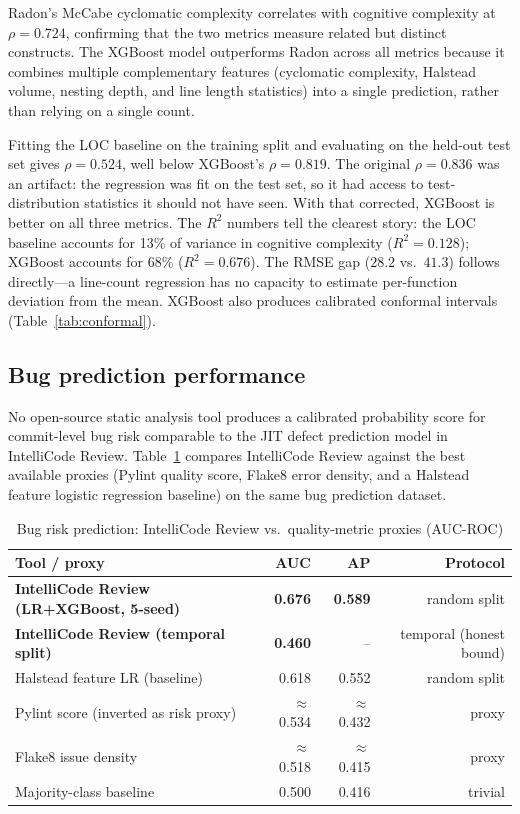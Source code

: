 \documentclass[12pt, oneside]{report}
\begin{document}
Radon's McCabe cyclomatic complexity correlates with cognitive complexity at $\rho =
0.724$, confirming that the two metrics measure related but distinct constructs. The
XGBoost model outperforms Radon across all metrics because it combines multiple
complementary features (cyclomatic complexity, Halstead volume, nesting depth, and line
length statistics) into a single prediction, rather than relying on a single count.

Fitting the LOC baseline on the training split and evaluating on the held-out test set gives $\rho = 0.524$, well below XGBoost's $\rho = 0.819$. The original $\rho = 0.836$ was an artifact: the regression was fit on the test set, so it had access to test-distribution statistics it should not have seen. With that corrected, XGBoost is better on all three metrics. The $R^2$ numbers tell the clearest story: the LOC baseline accounts for 13\% of variance in cognitive complexity ($R^2 = 0.128$); XGBoost accounts for 68\% ($R^2 = 0.676$). The RMSE gap ($28.2$ vs.\ $41.3$) follows directly---a line-count regression has no capacity to estimate per-function deviation from the mean. XGBoost also produces calibrated conformal intervals (Table~\ref{tab:conformal}).

\subsection{Bug prediction performance}

No open-source static analysis tool produces a calibrated probability score for
commit-level bug risk comparable to the JIT defect prediction model in IntelliCode
Review. Table~\ref{tab:market-bugs} compares IntelliCode Review against the best
available proxies (Pylint quality score, Flake8 error density, and a Halstead feature logistic regression baseline) on the same bug prediction dataset.

\begin{table}[H]
\centering
\caption{Bug risk prediction: IntelliCode Review vs.\ quality-metric proxies (AUC-ROC)}
\label{tab:market-bugs}
\begin{tabular}{@{}lrrr@{}}
\toprule
\textbf{Tool / proxy} & \textbf{AUC} & \textbf{AP} & \textbf{Protocol} \\
\midrule
\textbf{IntelliCode Review (LR+XGBoost, 5-seed)} & \textbf{0.676} & \textbf{0.589} & random split \\
\textbf{IntelliCode Review (temporal split)}      & \textbf{0.460} & -- & temporal (honest bound) \\
Halstead feature LR (baseline)                    & 0.618          & 0.552          & random split \\
Pylint score (inverted as risk proxy)             & $\approx$0.534 & $\approx$0.432 & proxy \\
Flake8 issue density                              & $\approx$0.518 & $\approx$0.415 & proxy \\
Majority-class baseline                           & 0.500          & 0.416          & trivial \\
\bottomrule
\end{tabular}
\end{table}
\end{document}
